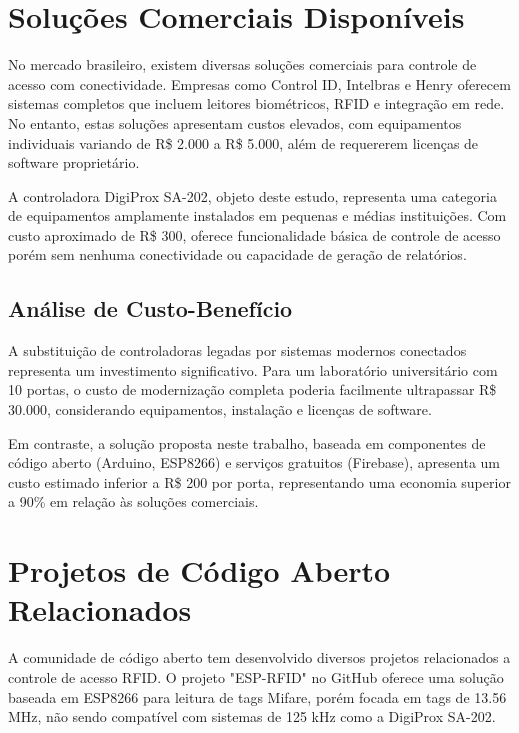 \section{Soluções Comerciais Disponíveis}
\label{Sec:SolucoesComerciais}

No mercado brasileiro, existem diversas soluções comerciais para controle de acesso com conectividade. Empresas como Control ID, Intelbras e Henry oferecem sistemas completos que incluem leitores biométricos, RFID e integração em rede. No entanto, estas soluções apresentam custos elevados, com equipamentos individuais variando de R\$ 2.000 a R\$ 5.000, além de requererem licenças de software proprietário.

A controladora DigiProx SA-202, objeto deste estudo, representa uma categoria de equipamentos amplamente instalados em pequenas e médias instituições. Com custo aproximado de R\$ 300, oferece funcionalidade básica de controle de acesso porém sem nenhuma conectividade ou capacidade de geração de relatórios.

\subsection{Análise de Custo-Benefício}

A substituição de controladoras legadas por sistemas modernos conectados representa um investimento significativo. Para um laboratório universitário com 10 portas, o custo de modernização completa poderia facilmente ultrapassar R\$ 30.000, considerando equipamentos, instalação e licenças de software.

Em contraste, a solução proposta neste trabalho, baseada em componentes de código aberto (Arduino, ESP8266) e serviços gratuitos (Firebase), apresenta um custo estimado inferior a R\$ 200 por porta, representando uma economia superior a 90\% em relação às soluções comerciais.

\section{Projetos de Código Aberto Relacionados}
\label{Sec:ProjetosCodigoAberto}

A comunidade de código aberto tem desenvolvido diversos projetos relacionados a controle de acesso RFID. O projeto "ESP-RFID" no GitHub oferece uma solução baseada em ESP8266 para leitura de tags Mifare, porém focada em tags de 13.56 MHz, não sendo compatível com sistemas de 125 kHz como a DigiProx SA-202.

